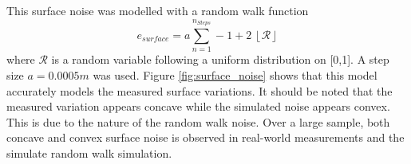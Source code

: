 		This surface noise was modelled with a random walk function
		\begin{equation}
			e_{surface} = a\sum_{n = 1}^{n_{Steps}}-1 + 2\:\left \lfloor{\mathcal{R}}\right \rfloor 
		\end{equation} 
		where $\mathcal{R}$ is a random variable following a uniform distribution on [0,1]. A step size $a = 0.0005m$ was used. Figure \ref{fig:surface_noise} shows that this model accurately models the measured surface variations. It should be noted that the measured variation appears concave while the simulated noise appears convex. This is due to the nature of the random walk noise. Over a large sample, both concave and convex surface noise is observed in real-world measurements and the simulate random walk simulation.

		\begin{figure}
	  		\centering
\end{figure}
